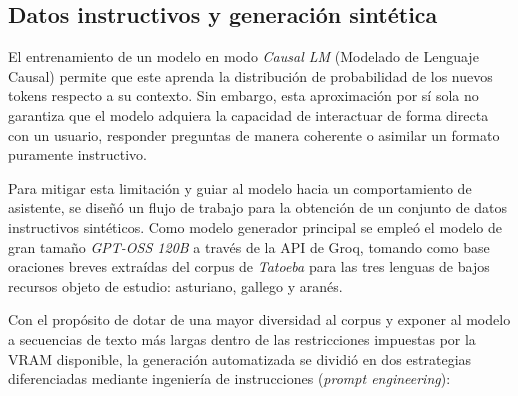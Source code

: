 \subsection{Datos instructivos y generación sintética}
\label{datos-instructivos}

El entrenamiento de un modelo en modo \textit{Causal LM} (Modelado de Lenguaje Causal) permite que este aprenda la distribución de probabilidad de los nuevos tokens respecto a su contexto. Sin embargo, esta aproximación por sí sola no garantiza que el modelo adquiera la capacidad de interactuar de forma directa con un usuario, responder preguntas de manera coherente o asimilar un formato puramente instructivo. 

Para mitigar esta limitación y guiar al modelo hacia un comportamiento de asistente, se diseñó un flujo de trabajo para la obtención de un conjunto de datos instructivos sintéticos. Como modelo generador principal se empleó el modelo de gran tamaño \textit{GPT-OSS 120B} a través de la API de Groq, tomando como base oraciones breves extraídas del corpus de \textit{Tatoeba} para las tres lenguas de bajos recursos objeto de estudio: asturiano, gallego y aranés. 

Con el propósito de dotar de una mayor diversidad al corpus y exponer al modelo a secuencias de texto más largas dentro de las restricciones impuestas por la VRAM disponible, la generación automatizada se dividió en dos estrategias diferenciadas mediante ingeniería de instrucciones (\textit{prompt engineering}):

